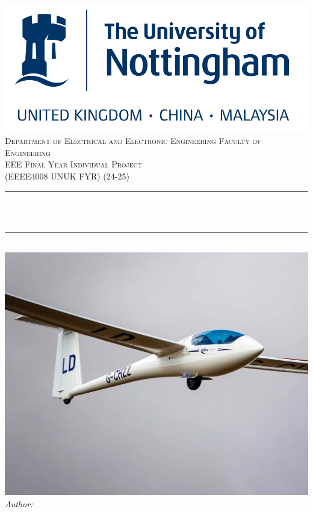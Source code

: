\begin{titlepage}
    \centering
    \includegraphics[scale = 0.4]{Config/uon.png}\\[1.0 cm]	%

    
    \textsc{\Large Department of Electrical and Electronic Engineering
    Faculty of Engineering}\\[0.5 cm]	%
    \textsc{\large EEE Final Year Individual Project}\\[0.5 cm]				%
    \textsc{\large (EEEE4008 UNUK FYR) (24-25)}\\[0.5 cm]				%

    \rule{\linewidth}{0.2 mm} \\[0.4 cm]
    { \huge \bfseries \thetitle}\\
    \rule{\linewidth}{0.2 mm} \\[0.5 cm]

    \includegraphics[scale = 0.3]{Config/a.jpg}\\[1.0 cm]

    \large \emph{Author:} \theauthor \\[0.5 cm]


    {\large \thedate}\\[0 cm]

    \vfill

\end{titlepage}

